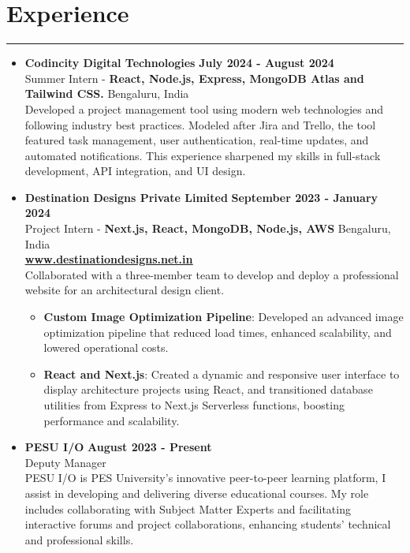 \documentclass[a4paper,10pt]{article}
\begin{document}
\section*{Experience}
\vspace{-.2em}
\hrule
\vspace{0.5em}
\begin{itemize}
    \item \textbf{Codincity Digital Technologies} \hfill \textbf{July 2024 - August 2024} \\ Summer Intern - \textbf{React, Node.js, Express, MongoDB Atlas and Tailwind CSS.} \vspace{0.25em} \hfill Bengaluru, India \\
    Developed a project management tool using modern web technologies and following industry best practices. Modeled after Jira and Trello, the tool featured task management, user authentication, real-time updates, and automated notifications. This experience sharpened my skills in full-stack development, API integration, and UI design.
    \vspace{0.5em}
          
    \item \textbf{Destination Designs Private Limited} \hfill \textbf{September 2023 - January 2024} \\
          Project Intern - \textbf{Next.js, React, MongoDB, Node.js, AWS} \hfill Bengaluru, India \\ \textbf{\href{https://www.destinationdesigns.net.in/}{\underline{www.destinationdesigns.net.in}}}  \vspace{0.25em} \\ Collaborated with a three-member team to develop and deploy a professional website for an architectural design client. 
	      \begin{itemize}
		      \item \textbf{Custom Image Optimization Pipeline}: Developed an advanced image optimization pipeline that reduced load times, enhanced scalability, and lowered operational costs.
		      \item \textbf{React and Next.js}: Created a dynamic and responsive user interface to display architecture projects using React, and transitioned database utilities from Express to Next.js Serverless functions, boosting performance and scalability.
	      \end{itemize}
    \item \textbf{PESU I/O} \hfill \textbf{August 2023 - Present} \\ \vspace{0.5em}
    Deputy Manager \\
    PESU I/O is PES University's innovative peer-to-peer learning platform, I assist in developing and delivering diverse educational courses. My role includes collaborating with Subject Matter Experts and facilitating interactive forums and project collaborations, enhancing students' technical and professional skills.
\end{itemize}
\end{document}
